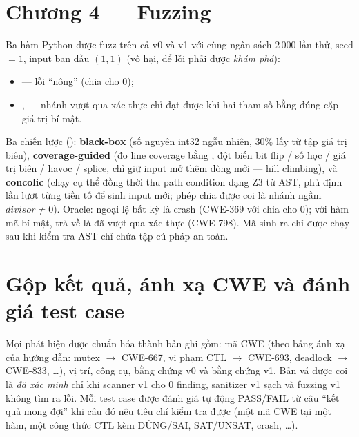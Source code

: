 \section{Chương 4 — Fuzzing}
Ba hàm Python được fuzz trên cả v0 và v1 với cùng ngân sách 2\,000 lần thử, seed $=1$, input
ban đầu $(1, 1)$ (vô hại, để lỗi phải được \emph{khám phá}):
\begin{itemize}
  \item {} — lỗi ``nông'' (chia cho 0);
  \item {},  — nhánh vượt qua xác thực
        chỉ đạt được khi hai tham số bằng đúng cặp giá trị bí mật.
\end{itemize}
Ba chiến lược (): \textbf{black-box} (số nguyên int32 ngẫu nhiên, 30\%
lấy từ tập giá trị biên), \textbf{coverage-guided} (đo line coverage bằng
, đột biến bit flip / số học / giá trị biên / havoc / splice, chỉ giữ input
mở thêm dòng mới — hill climbing), và \textbf{concolic} (chạy cụ thể đồng thời thu path condition
dạng Z3 từ AST, phủ định lần lượt từng tiền tố để sinh input mới; phép chia được coi là nhánh
ngầm $\mathit{divisor} \neq 0$). Oracle: ngoại lệ bất kỳ là crash (CWE-369 với chia cho 0);
với hàm mã bí mật, trả về  là đã vượt qua xác thực (CWE-798). Mã sinh ra chỉ được
chạy sau khi kiểm tra AST chỉ chứa tập cú pháp an toàn.

\section{Gộp kết quả, ánh xạ CWE và đánh giá test case}
Mọi phát hiện được chuẩn hóa thành bản ghi gồm: mã CWE (theo bảng ánh xạ của hướng dẫn: mutex
$\rightarrow$ CWE-667, vi phạm CTL $\rightarrow$ CWE-693, deadlock $\rightarrow$ CWE-833, \ldots),
vị trí, công cụ, bằng chứng v0 và bằng chứng v1. Bản vá được coi là \emph{đã xác minh} chỉ khi
scanner v1 cho 0 finding, sanitizer v1 sạch và fuzzing v1 không tìm ra lỗi. Mỗi test case được
đánh giá tự động PASS/FAIL từ câu ``kết quả mong đợi'' khi câu đó nêu tiêu chí kiểm tra được
(một mã CWE tại một hàm, một công thức CTL kèm ĐÚNG/SAI, SAT/UNSAT, crash, \ldots).
